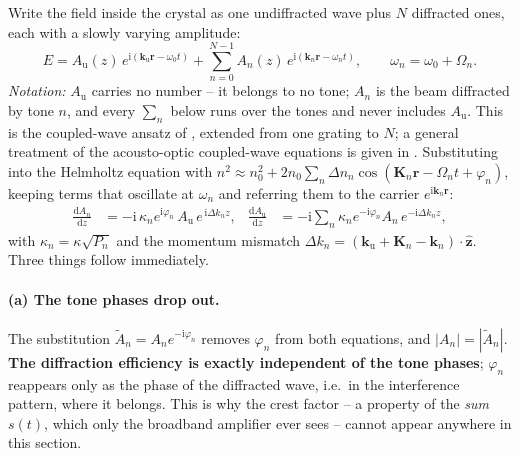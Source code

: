 \documentclass[11pt,a4paper]{article}
\newcommand{\Au}{\ensuremath{A_\mathrm{u}}}
\begin{document}
Write the field inside the crystal as one undiffracted wave plus $N$
diffracted ones, each with a slowly varying amplitude:
\begin{equation}
  E = \Au(z)\,e^{\mathrm{i}(\mathbf k_\mathrm{u}\mathbf r-\omega_0 t)}
    + \sum_{n=0}^{N-1} A_n(z)\,e^{\mathrm{i}(\mathbf k_n\mathbf r-\omega_n t)} ,
  \qquad \omega_n = \omega_0+\Omega_n .
  \label{eq:ansatz}
\end{equation}
\emph{Notation:} \Au{} carries no number -- it belongs to no tone; $A_n$ is
the beam diffracted by tone $n$, and every $\sum_n$ below runs over the tones
and never includes \Au. This is the coupled-wave ansatz of \cite{kogelnik1969}, extended from one
grating to $N$; a general treatment of the acousto-optic coupled-wave
equations is given in \cite{laude2003}. Substituting into the Helmholtz
equation with
$n^2 \approx n_0^2 + 2n_0\sum_n \Delta n_n\cos(\mathbf K_n\mathbf r
-\Omega_n t+\varphi_n)$, keeping terms that oscillate at $\omega_n$ and
referring them to the carrier $e^{\mathrm{i}\mathbf k_n\mathbf r}$:
\begin{align}
  \frac{\mathrm{d}A_n}{\mathrm{d}z}
    &= -\mathrm{i}\,\kappa_n e^{\mathrm{i}\varphi_n}\,\Au\,
       e^{\,\mathrm{i}\Delta k_n z} ,
  &\frac{\mathrm{d}\Au}{\mathrm{d}z}
    &= -\mathrm{i}\sum_n \kappa_n e^{-\mathrm{i}\varphi_n} A_n\,
       e^{-\mathrm{i}\Delta k_n z} ,
  \label{eq:coupledgen}
\end{align}
with $\kappa_n = \kappa\sqrt{P_n}$ and the momentum mismatch
$\Delta k_n = (\mathbf k_\mathrm{u}+\mathbf K_n-\mathbf k_n)\cdot\hat{\mathbf z}$.
Three things follow immediately.

\paragraph{(a) The tone phases drop out.} The substitution
$\tilde A_n = A_n e^{-\mathrm{i}\varphi_n}$ removes $\varphi_n$ from both
equations, and $|A_n| = |\tilde A_n|$. \textbf{The diffraction efficiency is
exactly independent of the tone phases}; $\varphi_n$ reappears only as the
phase of the diffracted wave, i.e.\ in the interference pattern, where it
belongs. This is why the crest factor -- a property of the \emph{sum} $s(t)$,
which only the broadband amplifier ever sees -- cannot appear anywhere in
this section.
\end{document}
